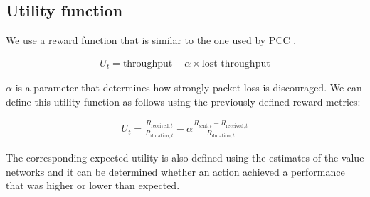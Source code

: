 \documentclass[sigconf]{acmart}
\begin{document}
\subsection{Utility function}
\label{subsec:utility}


We use a reward function that is similar to the one used by PCC \cite{dong_pcc:_2015}.

\begin{align*}
U_t = \text{throughput} - \alpha \times \text{lost throughput}
\end{align*}

$\alpha$ is a parameter that determines how strongly packet loss is discouraged. We can define this utility function as follows using the previously defined reward metrics: 

\begin{align*}
U_t = \frac{R_{\text{received},t}}{R_{\text{duration},t}} - \alpha \frac{R_{\text{sent},t} - R_{\text{received},t}}{R_{\text{duration},t}}
\end{align*}

The corresponding expected utility is also defined using the estimates of the value networks and it can be determined whether an action achieved a performance that was higher or lower than expected. 

%
%
\end{document}
